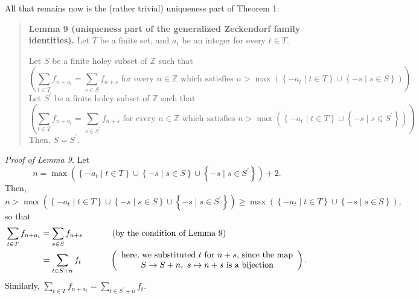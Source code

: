 \documentclass[12pt,final,notitlepage,onecolumn]{article}%
\begin{document}
All that remains now is the (rather trivial) uniqueness part of Theorem 1:

\begin{quote}
\textbf{Lemma 9 (uniqueness part of the generalized Zeckendorf family
identities).} Let $T$ be a finite set, and $a_{t}$ be an integer for every
$t\in T$.

Let $S$ be a finite holey subset of $\mathbb{Z}$ such that%
\[
\left(  \sum\limits_{t\in T}f_{n+a_{t}}=\sum\limits_{s\in S}f_{n+s}\text{ for
every }n\in\mathbb{Z}\text{ which satisfies }n>\max\left(  \left\{  -a_{t}\mid
t\in T\right\}  \cup\left\{  -s\mid s\in S\right\}  \right)  \right)  .
\]
Let $S^{\prime}$ be a finite holey subset of $\mathbb{Z}$ such that%
\[
\left(  \sum\limits_{t\in T}f_{n+a_{t}}=\sum\limits_{s\in S^{\prime}}%
f_{n+s}\text{ for every }n\in\mathbb{Z}\text{ which satisfies }n>\max\left(
\left\{  -a_{t}\mid t\in T\right\}  \cup\left\{  -s\mid s\in S^{\prime
}\right\}  \right)  \right)  .
\]
Then, $S=S^{\prime}$.
\end{quote}

\textit{Proof of Lemma 9.} Let%
\[
n=\max\left(  \left\{  -a_{t}\mid t\in T\right\}  \cup\left\{  -s\mid s\in
S\right\}  \cup\left\{  -s\mid s\in S^{\prime}\right\}  \right)  +2.
\]
Then,%
\[
n>\max\left(  \left\{  -a_{t}\mid t\in T\right\}  \cup\left\{  -s\mid s\in
S\right\}  \cup\left\{  -s\mid s\in S^{\prime}\right\}  \right)  \geq
\max\left(  \left\{  -a_{t}\mid t\in T\right\}  \cup\left\{  -s\mid s\in
S\right\}  \right)  ,
\]
so that%
\begin{align*}
\sum\limits_{t\in T}f_{n+a_{t}}  &  =\sum\limits_{s\in S}f_{n+s}%
\ \ \ \ \ \ \ \ \ \ \left(  \text{by the condition of Lemma 9}\right) \\
&  =\sum\limits_{t\in S+n}f_{t}\ \ \ \ \ \ \ \ \ \ \left(
\begin{array}
[c]{c}%
\text{here, we substituted }t\text{ for }n+s\text{, since the map}\\
S\rightarrow S+n,\ s\mapsto n+s\text{ is a bijection}%
\end{array}
\right)  .
\end{align*}
Similarly, $\sum\limits_{t\in T}f_{n+a_{t}}=\sum\limits_{t\in S^{\prime}%
+n}f_{t}$.
\end{document}
